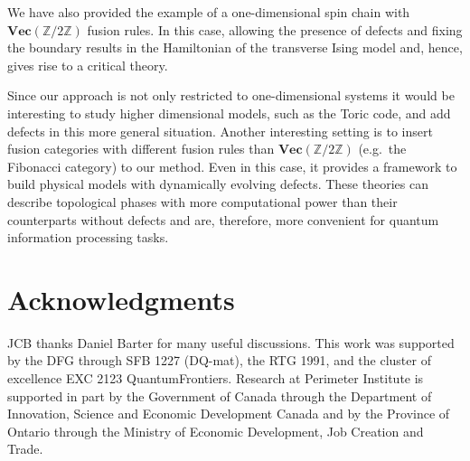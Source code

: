 \documentclass[a4paper,oneside]{amsart}
\renewcommand{\Vec}{\textbf{Vec}}
\newcommand{\Z}{\mathbb{Z}}
\theoremstyle{plain}%
\theoremstyle{definition}
\theoremstyle{remark}
\begin{document}
We have also provided the example of a one-dimensional spin chain with $\Vec(\Z/2\Z)$ fusion rules. In this case, allowing the presence of defects and fixing the boundary results in the Hamiltonian of the transverse Ising model and, hence, gives rise to a critical theory.

Since our approach is not only restricted to one-dimensional systems it would be interesting to study higher dimensional models, such as the Toric code, and add defects in this more general situation. Another interesting setting is to insert fusion categories with different fusion rules than $\Vec(\Z/2\Z)$ (e.g.\ the Fibonacci category) to our method. Even in this case, it provides a framework to build physical models with dynamically evolving defects. These theories can describe topological phases with more computational power than their counterparts without defects and are, therefore, more convenient for quantum information processing tasks.


\section*{Acknowledgments}
JCB thanks Daniel Barter for many useful discussions. This work was supported by the DFG through SFB 1227 (DQ-mat), the RTG 1991, and the cluster of excellence EXC 2123 QuantumFrontiers. Research at Perimeter Institute is supported in part by the Government of Canada through the Department of Innovation, Science and Economic Development Canada and by the Province of Ontario through the Ministry of Economic Development, Job Creation and Trade.




\end{document}
